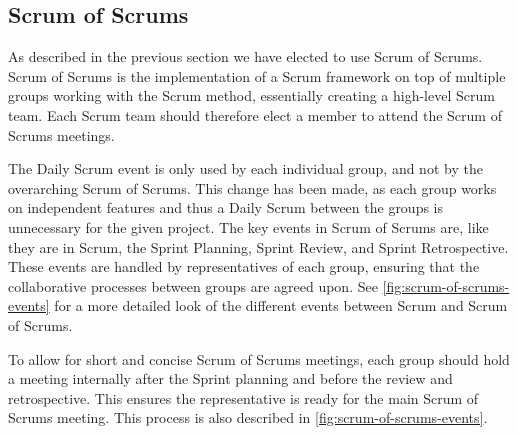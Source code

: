 \subsection{Scrum of Scrums}\label{sub:scrum-of-scrums}
As described in the previous section we have elected to use Scrum of Scrums. Scrum of Scrums is the implementation of a Scrum framework on top of multiple groups working with the Scrum method, essentially creating a high-level Scrum team. Each Scrum team should therefore elect a member to attend the Scrum of Scrums meetings.

The Daily Scrum event is only used by each individual group, and not by the overarching Scrum of Scrums. This change has been made, as each group works on independent features and thus a Daily Scrum between the groups is unnecessary for the given project.
The key events in Scrum of Scrums are, like they are in Scrum, the Sprint Planning, Sprint Review, and Sprint Retrospective. These events are handled by representatives of each group, ensuring that the collaborative processes between groups are agreed upon.
See \autoref{fig:scrum-of-scrums-events} for a more detailed look of the different events between Scrum and Scrum of Scrums.

To allow for short and concise Scrum of Scrums meetings, each group should hold a meeting internally after the Sprint planning and before the review and retrospective. This ensures the representative is ready for the main Scrum of Scrums meeting. This process is also described in \autoref{fig:scrum-of-scrums-events}.



